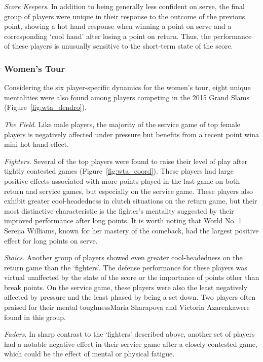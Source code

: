 \documentclass{Latex/svjour3}
\begin{document}
\textit{Score Keepers}. In addition to being generally less confident on serve,
the final group of players were unique in their response to the outcome of the
previous point, showing a hot hand response when winning a point on serve and a
corresponding `cool hand' after losing a point on return. Thus, the performance
of these players is unusually sensitive to the short-term state of the score.

\subsubsection{Women's Tour}

Considering the six player-specific dynamics for the women's tour, eight unique
mentalities were also found among players competing in the 2015 Grand Slams
(Figure~\ref{fig:wta_dendro}).

\textit{The Field}. Like male players, the majority of the service game of top
female players is negatively affected under pressure but benefits from a recent
point win\textemdash a mini hot hand effect.

\textit{Fighters}. Several of the top players were found to raise their level of
play after tightly contested games (Figure~\ref{fig:wta_coord}). These players
had large positive effects associated with more points played in the last game
on both return and service games, but especially on the service game. These
players also exhibit greater cool-headedness in clutch situations on the return
game, but their most distinctive characteristic is the fighter's mentality
suggested by their improved performance after long points. It is worth noting
that World No. 1 Serena Williams, known for her mastery of the comeback, had the
largest positive effect for long points on serve. 

\textit{Stoics}. Another group of players showed even greater cool-headedness on
the return game than the `fighters'. The defense performance for these players
was virtual unaffected by the state of the score or the importance of points
other than break points. On the service game, these players were also the least
negatively affected by pressure and the least phased by being a set down. Two
players often praised for their mental toughness\textemdash Maria Sharapova and
Victoria Azarenka\textemdash were found in this group.

\textit{Faders}. In sharp contrast to the `fighters' described above, another
set of players had a notable negative effect in their service game after a
closely contested game, which could be the effect of mental or physical fatigue.
\end{document}
